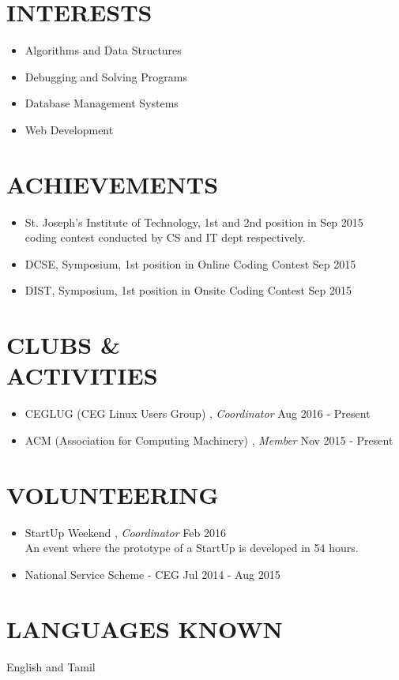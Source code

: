 \documentclass[margin, 10pt]{res} %
\begin{document}
\begin{resume}
\section{INTERESTS} 
\begin{itemize}
\item Algorithms and Data Structures
\item Debugging and Solving Programs
\item Database Management Systems
\item Web Development
\end{itemize}




\section{ACHIEVEMENTS}
\begin{itemize} 
\item St. Joseph's Institute of Technology, 1st and 2nd position in \hfill Sep 2015 \\ coding contest conducted by CS and IT dept respectively.
\item DCSE, Symposium, 1st position in Online Coding Contest \hfill Sep 2015
\item DIST, Symposium, 1st position in Onsite Coding Contest \hfill Sep 2015
\end{itemize}


\section{CLUBS \& \\ACTIVITIES}
\begin{itemize}
\item CEGLUG (CEG Linux Users Group) , {\sl Coordinator} \hfill Aug 2016 - Present
\item ACM (Association for Computing Machinery) , {\sl Member} \hfill Nov 2015 - Present
\end{itemize}

\section{VOLUNTEERING}
\begin{itemize}
\item StartUp Weekend , {\sl Coordinator} \hfill Feb 2016 \\
An event where the prototype of a StartUp is developed in 54 hours.
\item National Service Scheme - CEG \hfill Jul 2014 - Aug 2015 
\end{itemize}
\section{LANGUAGES KNOWN}  English and Tamil




 


\end{resume}
\end{document}
